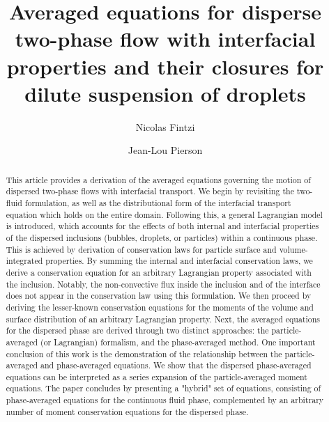 \documentclass[11pt]{My_preprint}
\title{Averaged equations for disperse two-phase flow with interfacial properties and their closures for dilute suspension of droplets}
\author[1,2]{Nicolas Fintzi}
\author[1]{Jean-Lou Pierson}
\affil[1]{IFP Energies Nouvelles, Rond-point de l'echangeur de Solaize, 69360 Solaize}
\affil[2]{Sorbonne Universit\'e, Institut Jean le Rond $\partial$'Alembert, 4 place Jussieu, 75252 PARIS CEDEX 05, France}
\begin{document}
\maketitle

\begin{abstract}
This article provides a derivation of the averaged equations governing the motion of dispersed two-phase flows with interfacial transport. 
We begin by revisiting the two-fluid formulation, as well as the distributional form of the interfacial transport equation which holds on the entire domain. 
Following this, a general Lagrangian model is introduced, which accounts for the effects of both internal and interfacial properties of the dispersed inclusions (bubbles, droplets, or particles) within a continuous phase.
This is achieved by derivation of conservation laws for particle surface and volume-integrated properties. 
By summing the internal and interfacial conservation laws, we derive a conservation equation for an arbitrary Lagrangian property associated with the inclusion. 
Notably, the non-convective flux inside the inclusion and of the interface does not appear in the conservation law using this formulation. 
We then proceed by deriving the lesser-known conservation equations for the moments of the volume and surface distribution of an arbitrary Lagrangian property.  
Next, the averaged equations for the dispersed phase are derived through two distinct approaches: the particle-averaged (or Lagrangian) formalism, and the phase-averaged method. 
One important conclusion of this work is the demonstration of the relationship between the particle-averaged and phase-averaged equations. 
We show that the dispersed phase-averaged equations can be interpreted as a series expansion of the particle-averaged moment equations. 
The paper concludes by presenting a "hybrid" set of equations, consisting of phase-averaged equations for the continuous fluid phase, complemented by an arbitrary number of moment conservation equations for the dispersed phase.
\end{abstract}











\end{document}
